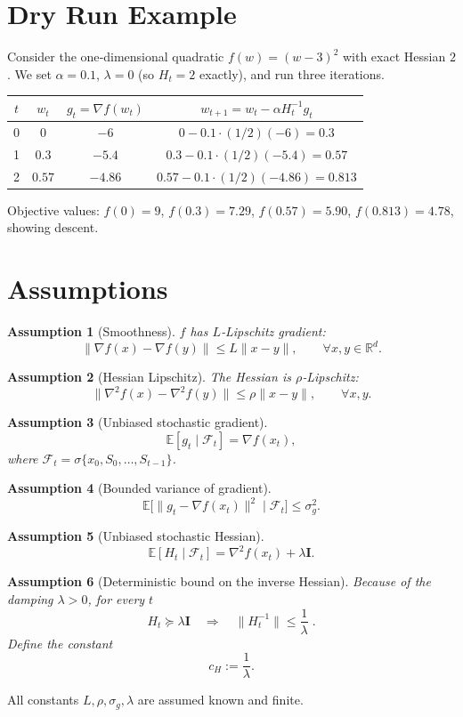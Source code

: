 \documentclass{article}
\newtheorem{assumption}{Assumption}
\newcommand{\E}{\mathbb{E}}
\newcommand{\Id}{\mathbf I}
\begin{document}
\section*{Dry Run Example}
Consider the one‑dimensional quadratic $f(w)=(w-3)^2$ with exact Hessian $2$.  
We set $\alpha=0.1$, $\lambda=0$ (so $H_t=2$ exactly), and run three iterations.

\begin{tabular}{c|c|c|c}
$t$ & $w_t$ & $g_t=\nabla f(w_t)$ & $w_{t+1}=w_t-\alpha H_t^{-1}g_t$ \\ \hline
0 & $0$ & $-6$ & $0-0.1\cdot(1/2)(-6)=0.3$ \\
1 & $0.3$ & $-5.4$ & $0.3-0.1\cdot(1/2)(-5.4)=0.57$ \\
2 & $0.57$ & $-4.86$ & $0.57-0.1\cdot(1/2)(-4.86)=0.813$ \\
\end{tabular}

Objective values: $f(0)=9$, $f(0.3)=7.29$, $f(0.57)=5.90$, $f(0.813)=4.78$, showing descent.

\section*{Assumptions}
\begin{assumption}[Smoothness]\label{as:smooth}
$f$ has $L$‑Lipschitz gradient:
\[
\|\nabla f(x)-\nabla f(y)\|\le L\|x-y\|,\qquad\forall x,y\in\mathbb{R}^d.
\]
\end{assumption}
\begin{assumption}[Hessian Lipschitz]\label{as:hessian}
The Hessian is $\rho$‑Lipschitz:
\[
\|\nabla^2 f(x)-\nabla^2 f(y)\|\le \rho\|x-y\|,\qquad\forall x,y.
\]
\end{assumption}
\begin{assumption}[Unbiased stochastic gradient]\label{as:grad-unbiased}
\[
\E[g_t\mid \mathcal{F}_t]=\nabla f(x_t),
\]
where $\mathcal{F}_t=\sigma\{x_0,S_0,\dots,S_{t-1}\}$.
\end{assumption}
\begin{assumption}[Bounded variance of gradient]\label{as:grad-var}
\[
\E\big[\|g_t-\nabla f(x_t)\|^2\mid\mathcal{F}_t\big]\le\sigma_g^2.
\]
\end{assumption}
\begin{assumption}[Unbiased stochastic Hessian]\label{as:hess-unbiased}
\[
\E[H_t\mid\mathcal{F}_t]=\nabla^2 f(x_t)+\lambda\Id .
\]
\end{assumption}
\begin{assumption}[Deterministic bound on the inverse Hessian]\label{as:hess-inv}
Because of the damping $\lambda>0$, for every $t$
\[
H_t\succeq \lambda\Id\quad\Longrightarrow\quad 
\|H_t^{-1}\|\le \frac1\lambda\; .
\]
Define the constant
\[
c_H:=\frac1\lambda .
\tag{A6'}
\]
\end{assumption}
All constants $L,\rho,\sigma_g,\lambda$ are assumed known and finite.
\end{document}
